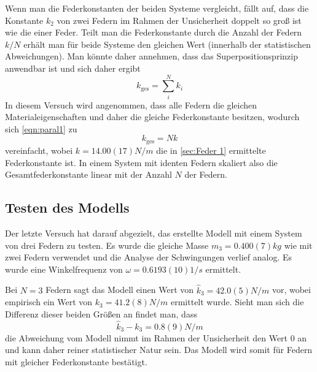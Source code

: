 Wenn man die Federkonstanten der beiden Systeme vergleicht, fällt auf, dass die Konstante \( k_2 \) von zwei Federn im Rahmen der Unsicherheit doppelt so groß ist wie die einer Feder. Teilt man die Federkonstante durch die Anzahl der Federn \( k/N \) erhält man für beide Systeme den gleichen Wert (innerhalb der statistischen Abweichungen). Man könnte daher annehmen, dass das Superpositionsprinzip anwendbar ist und sich daher ergibt
\begin{equation}\label{eqn:paral1}
	k_{\text{ges}} = \sum_{i}^{N} k_i
\end{equation}
In diesem Versuch wird angenommen, dass alle Federn die gleichen Materialeigenschaften und daher die gleiche Federkonstante besitzen, wodurch sich \autoref{eqn:paral1} zu
\begin{equation}\label{eqn:paral2}
	k_{\text{ges}} = Nk
\end{equation}
vereinfacht, wobei \( k = 14.00(17) \unit{N/m} \) die in \autoref{sec:Feder 1} ermittelte Federkonstante ist. In einem System mit identen Federn skaliert also die Gesamtfederkonstante linear mit der Anzahl \( N \) der Federn.

\subsection{Testen des Modells}
Der letzte Versuch hat darauf abgezielt, das erstellte Modell mit einem System von drei Federn zu testen. Es wurde die gleiche Masse \( m_3 = 0.400(7) \unit{kg} \) wie mit zwei Federn verwendet und die Analyse der Schwingungen verlief analog. Es wurde eine Winkelfrequenz von \( \omega = 0.6193(10) \unit{1/s} \) ermittelt.

Bei \( N = 3 \) Federn sagt das Modell einen Wert von \( \hat{k}_3 = 42.0(5) \unit{N/m} \) vor, wobei empirisch ein Wert von \( k_3 = 41.2(8) \unit{N/m} \) ermittelt wurde. Sieht man sich die Differenz dieser beiden Größen an findet man, dass
\begin{equation}\label{eqn:diff}
	\hat{k}_3 - k_3 = 0.8(9) \unit{N/m}
\end{equation}
die Abweichung vom Modell nimmt im Rahmen der Unsicherheit den Wert 0 an und kann daher reiner statistischer Natur sein. Das Modell wird somit für Federn mit gleicher Federkonstante bestätigt.






